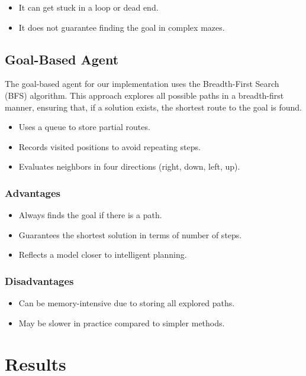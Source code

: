 \documentclass[letterpaper,12pt,oneside]{article}
\begin{document}
\begin{itemize}
    \item It can get stuck in a loop or dead end.
    \item It does not guarantee finding the goal in complex mazes.
\end{itemize}

\subsection{Goal-Based Agent}

The goal-based agent for our implementation uses the Breadth-First Search (BFS) algorithm. This approach explores all possible paths in a breadth-first manner, ensuring that, if a solution exists, the shortest route to the goal is found.

\begin{itemize}
    \item Uses a queue to store partial routes.
    \item Records visited positions to avoid repeating steps.
    \item Evaluates neighbors in four directions (right, down, left, up).
\end{itemize}

\subsubsection{Advantages}

\begin{itemize}
    \item Always finds the goal if there is a path.
    \item Guarantees the shortest solution in terms of number of steps.
    \item Reflects a model closer to intelligent planning.
\end{itemize}
\subsubsection{Disadvantages}

\begin{itemize}
    \item Can be memory-intensive due to storing all explored paths.
    \item May be slower in practice compared to simpler methods.
\end{itemize}

\section{Results}
\end{document}
